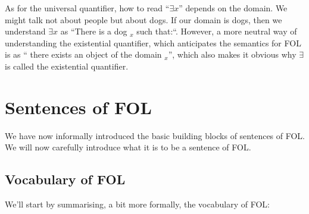 As for the universal quantifier, how to read ``$\exists x$'' depends on the domain. We might talk not about people but about dogs. If our domain is dogs, then we understand $\exists x$ as ``There is a dog $_x$ such that:``. However, a more neutral way of understanding the existential quantifier, which anticipates the semantics for FOL is as `` there exists an object of the domain $_x$'', which also makes it obvious why $\exists $ is called the existential quantifier.  


\chapter{Sentences of FOL}\label{s:FOLSentences}
We have now informally introduced the basic building blocks of sentences of FOL. We will now carefully introduce what it is to be a sentence of FOL.



\section{Vocabulary of FOL}
We'll start by summarising, a bit more formally, the vocabulary of FOL:

